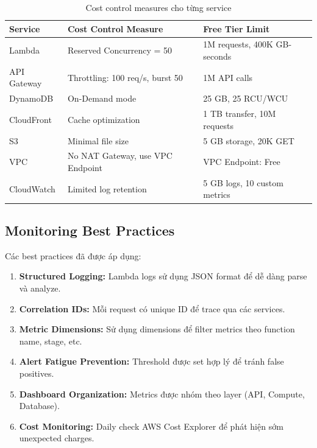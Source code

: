 \begin{table}[H]
\centering
\begin{tabular}{|l|p{6cm}|p{4cm}|}
\hline
\textbf{Service} & \textbf{Cost Control Measure} & \textbf{Free Tier Limit} \\
\hline
Lambda & Reserved Concurrency = 50 & 1M requests, 400K GB-seconds \\
\hline
API Gateway & Throttling: 100 req/s, burst 50 & 1M API calls \\
\hline
DynamoDB & On-Demand mode & 25 GB, 25 RCU/WCU \\
\hline
CloudFront & Cache optimization & 1 TB transfer, 10M requests \\
\hline
S3 & Minimal file size & 5 GB storage, 20K GET \\
\hline
VPC & No NAT Gateway, use VPC Endpoint & VPC Endpoint: Free \\
\hline
CloudWatch & Limited log retention & 5 GB logs, 10 custom metrics \\
\hline
\end{tabular}
\caption{Cost control measures cho từng service}
\label{tab:cost_control}
\end{table}

\subsection{Monitoring Best Practices}
\label{ssec:monitoring_best_practices}

Các best practices đã được áp dụng:

\begin{enumerate}
    \item \textbf{Structured Logging:} Lambda logs sử dụng JSON format để dễ dàng parse và analyze.
    
    \item \textbf{Correlation IDs:} Mỗi request có unique ID để trace qua các services.
    
    \item \textbf{Metric Dimensions:} Sử dụng dimensions để filter metrics theo function name, stage, etc.
    
    \item \textbf{Alert Fatigue Prevention:} Threshold được set hợp lý để tránh false positives.
    
    \item \textbf{Dashboard Organization:} Metrics được nhóm theo layer (API, Compute, Database).
    
    \item \textbf{Cost Monitoring:} Daily check AWS Cost Explorer để phát hiện sớm unexpected charges.
\end{enumerate}

